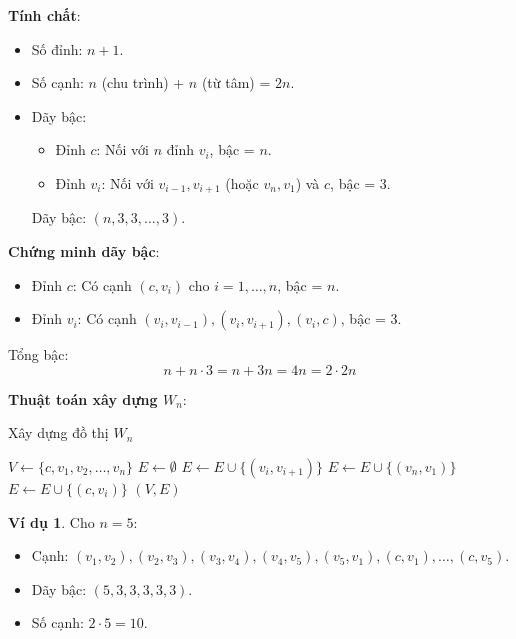 \documentclass[a4paper,12pt]{article}
\theoremstyle{plain}
\theoremstyle{definition}
\newtheorem{example}{Ví dụ}
\begin{document}
\textbf{Tính chất}:
\begin{itemize}
    \item Số đỉnh: \( n+1 \).
    \item Số cạnh: \( n \) (chu trình) + \( n \) (từ tâm) = \( 2n \).
    \item Dãy bậc:
    \begin{itemize}
        \item Đỉnh \( c \): Nối với \( n \) đỉnh \( v_i \), bậc = \( n \).
        \item Đỉnh \( v_i \): Nối với \( v_{i-1}, v_{i+1} \) (hoặc \( v_n, v_1 \)) và \( c \), bậc = 3.
    \end{itemize}
    Dãy bậc: \( (n, 3, 3, \ldots, 3) \).
\end{itemize}

\textbf{Chứng minh dãy bậc}:
\begin{itemize}
    \item Đỉnh \( c \): Có cạnh \( (c, v_i) \) cho \( i=1,\ldots,n \), bậc = \( n \).
    \item Đỉnh \( v_i \): Có cạnh \( (v_i, v_{i-1}), (v_i, v_{i+1}), (v_i, c) \), bậc = 3.
\end{itemize}
Tổng bậc:
\[
n + n \cdot 3 = n + 3n = 4n = 2 \cdot 2n
\]

\textbf{Thuật toán xây dựng \( W_n \)}:
\begin{algorithm}
\caption{Xây dựng đồ thị \( W_n \)}
\begin{algorithmic}
    \State $V \gets \{c, v_1, v_2, \ldots, v_n\}$
    \State $E \gets \emptyset$
        \State $E \gets E \cup \{(v_i, v_{i+1})\}$
    \EndFor
    \State $E \gets E \cup \{(v_n, v_1)\}$
        \State $E \gets E \cup \{(c, v_i)\}$
    \EndFor
    \State \Return $(V, E)$
\EndFunction
\end{algorithmic}
\end{algorithm}

\begin{example}
Cho \( n=5 \):
\begin{itemize}
    \item Cạnh: \( (v_1, v_2), (v_2, v_3), (v_3, v_4), (v_4, v_5), (v_5, v_1), (c, v_1), \ldots, (c, v_5) \).
    \item Dãy bậc: \( (5, 3, 3, 3, 3, 3) \).
    \item Số cạnh: \( 2 \cdot 5 = 10 \).
\end{itemize}
\end{example}
\end{document}
